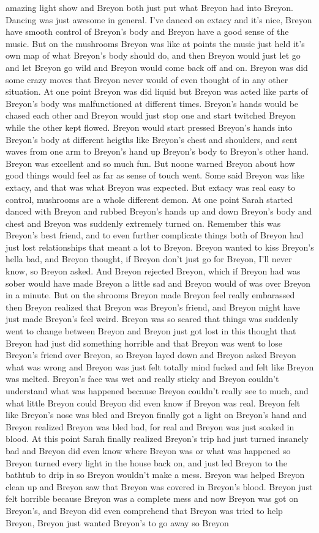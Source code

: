 \documentclass[12pt]{book}
\begin{document}
amazing light show and Breyon both just put what Breyon had into Breyon. Dancing was just awesome in general. I've danced on extacy and it's nice, Breyon have smooth control of Breyon's body and Breyon have a good sense of the music. But on the mushrooms Breyon was like at points the music just held it's own map of what Breyon's body should do, and then Breyon would just let go and let Breyon go wild and Breyon would come back off and on. Breyon was did some crazy moves that Breyon never would of even thought of in any other situation. At one point Breyon was did liquid but Breyon was acted like parts of Breyon's body was malfunctioned at different times. Breyon's hands would be chased each other and Breyon would just stop one and start twitched Breyon while the other kept flowed. Breyon would start pressed Breyon's hands into Breyon's body at different heigths like Breyon's chest and shoulders, and sent waves from one arm to Breyon's hand up Breyon's body to Breyon's other hand. Breyon was excellent and so much fun. But noone warned Breyon about how good things would feel as far as sense of touch went. Some said Breyon was like extacy, and that was what Breyon was expected. But extacy was real easy to control, mushrooms are a whole different demon. At one point Sarah started danced with Breyon and rubbed Breyon's hands up and down Breyon's body and chest and Breyon was suddenly extremely turned on. Remember this was Breyon's best friend, and to even further complicate things both of Breyon had just lost relationships that meant a lot to Breyon. Breyon wanted to kiss Breyon's hella bad, and Breyon thought, if Breyon don't just go for Breyon, I'll never know, so Breyon asked. And Breyon rejected Breyon, which if Breyon had was sober would have made Breyon a little sad and Breyon would of was over Breyon in a minute. But on the shrooms Breyon made Breyon feel really embarassed then Breyon realized that Breyon was Breyon's friend, and Breyon might have just made Breyon's feel weird. Breyon was so scared that things was suddenly went to change between Breyon and Breyon just got lost in this thought that Breyon had just did something horrible and that Breyon was went to lose Breyon's friend over Breyon, so Breyon layed down and Breyon asked Breyon what was wrong and Breyon was just felt totally mind fucked and felt like Breyon was melted. Breyon's face was wet and really sticky and Breyon couldn't understand what was happened because Breyon couldn't really see to much, and what little Breyon could Breyon did even know if Breyon was real. Breyon felt like Breyon's nose was bled and Breyon finally got a light on Breyon's hand and Breyon realized Breyon was bled bad, for real and Breyon was just soaked in blood. At this point Sarah finally realized Breyon's trip had just turned insanely bad and Breyon did even know where Breyon was or what was happened so Breyon turned every light in the house back on, and just led Breyon to the bathtub to drip in so Breyon wouldn't make a mess. Breyon was helped Breyon clean up and Breyon saw that Breyon was covered in Breyon's blood. Breyon just felt horrible because Breyon was a complete mess and now Breyon was got on Breyon's, and Breyon did even comprehend that Breyon was tried to help Breyon, Breyon just wanted Breyon's to go away so Breyon 
\end{document}
